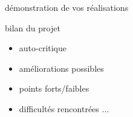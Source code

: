 \documentclass{beamer}
\begin{document}
	\begin{frame}
		démonstration de vos réalisations
	\end{frame}

	\begin{frame}
		bilan du projet
		\begin{itemize}
			\item auto-critique
			\item améliorations possibles
			\item points forts/faibles
			\item difficultés rencontrées ...
		\end{itemize}
	\end{frame}
\end{document}
